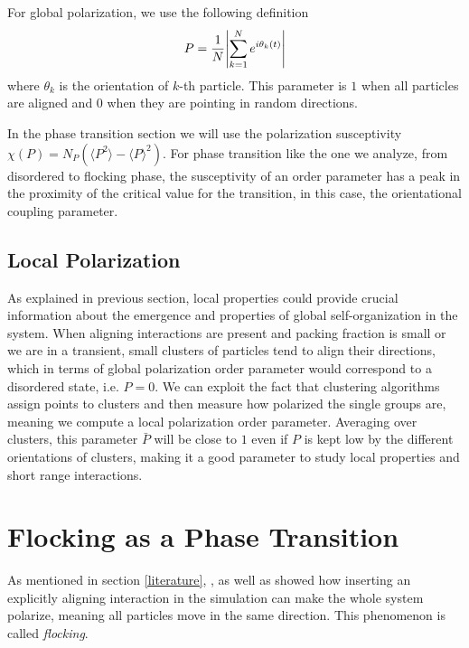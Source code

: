 \documentclass[../../master_thesis_np.tex]{subfiles}
\begin{document}
		For global polarization, we use the following definition \cite{caprini_spontaneous_2020}
		\begin{equation}
			P = \frac{1}{N} \abs{\sum_{k=1}^{N} e^{i \theta_k(t)}} 
		\end{equation}
		where $\theta_k$ is the orientation of $k$-th particle. 
		This parameter is $1$ when all particles are aligned and $0$ when they are pointing in random directions. 
		
		In the phase transition section we will use the polarization susceptivity $\chi(P) = N_P(\langle P^2 \rangle - \langle P \rangle^2)$.
		For phase transition like the one we analyze, from disordered to flocking phase, the susceptivity of an order parameter has a peak in the proximity of the critical value for the transition, in this case, the orientational coupling parameter.
		\subsection{Local Polarization}
		As explained in previous section, local properties could provide crucial information about the emergence and properties of global self-organization in the system. 
		When aligning interactions are present and packing fraction is small or we are in a transient, small clusters of particles tend to align their directions, which in terms of global polarization order parameter would correspond to a disordered state, i.e. $P = 0$. 
		We can exploit the fact that clustering algorithms assign points to clusters and then measure how polarized the single groups are, meaning we compute a local polarization order parameter. 
		Averaging over clusters, this parameter $\bar{P}$ will be close to $1$ even if $P$ is kept low by the different orientations of clusters, making it a good parameter to study local properties and short range interactions.
		
		\section{Flocking as a Phase Transition} \label{phasetrans}
		As mentioned in section \ref{literature}, \citeauthor{martin-gomez_collective_2018}, as well as \citeauthor{negi_emergent_2022} \cite{martin-gomez_collective_2018, negi_emergent_2022} showed how inserting an explicitly aligning interaction in the simulation can make the whole system polarize, meaning all particles move in the same direction. 
		This phenomenon is called \emph{flocking}.
		
\end{document}
